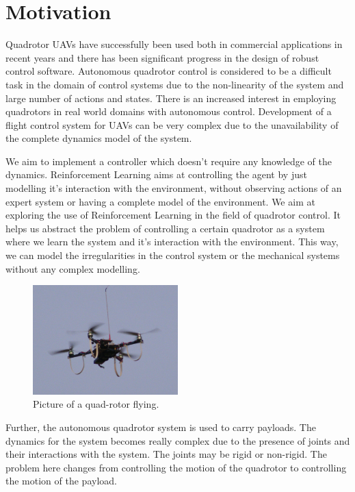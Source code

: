 \documentclass[hidelinks,BTech]{iitmdiss}
\begin{document}
\section{Motivation}
Quadrotor UAVs have successfully been used both in commercial applications in recent years and there has been significant progress in the design of robust control software. Autonomous quadrotor control is considered to be a difficult task in the domain of control systems due to the non-linearity of the system and large number of actions and states. There is an increased interest in employing quadrotors in real world domains with autonomous control. Development of a flight control system for UAVs can be very complex due to the unavailability of the complete dynamics model of the system. 


We aim to implement a controller which doesn't require any knowledge of the dynamics. Reinforcement Learning aims at controlling the agent by just modelling it's interaction with the environment, without observing actions of an expert system or having a complete model of the environment. We aim at exploring the use of Reinforcement Learning in the field of quadrotor control. It helps us abstract the problem of controlling a certain quadrotor as a system where we learn the system and it's interaction with the environment. This way, we can model the irregularities in the control system or the mechanical systems without any complex modelling. 

\begin{figure}[H]
  \centering
    \includegraphics[width=0.5\textwidth]{quadrotor.jpg}
    \caption{Picture of a quad-rotor flying.}
\end{figure}

Further, the autonomous quadrotor system is used to carry payloads. The dynamics for the system becomes really complex due to the presence of joints and their interactions with the system. The joints may be rigid or non-rigid. The problem here changes from controlling the motion of the quadrotor to controlling the motion of the payload. 
\end{document}
